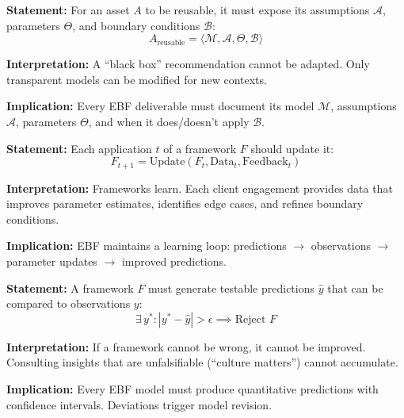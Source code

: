\begin{tcolorbox}[colback=gray!5!white, colframe=gray!75!black,
    title=Axiom FM-2: Transparency Principle]
\textbf{Statement:} For an asset $A$ to be reusable, it must expose its assumptions $\mathcal{A}$, parameters $\Theta$, and boundary conditions $\mathcal{B}$:
\begin{equation}
A_{\text{reusable}} = \langle \mathcal{M}, \mathcal{A}, \Theta, \mathcal{B} \rangle
\end{equation}

\textbf{Interpretation:} A ``black box'' recommendation cannot be adapted. Only transparent models can be modified for new contexts.

\textbf{Implication:} Every EBF deliverable must document its model $\mathcal{M}$, assumptions $\mathcal{A}$, parameters $\Theta$, and when it does/doesn't apply $\mathcal{B}$.
\end{tcolorbox}

\begin{tcolorbox}[colback=gray!5!white, colframe=gray!75!black,
    title=Axiom FM-3: Cumulative Growth Principle]
\textbf{Statement:} Each application $t$ of a framework $F$ should update it:
\begin{equation}
F_{t+1} = \text{Update}(F_t, \text{Data}_t, \text{Feedback}_t)
\end{equation}

\textbf{Interpretation:} Frameworks learn. Each client engagement provides data that improves parameter estimates, identifies edge cases, and refines boundary conditions.

\textbf{Implication:} EBF maintains a learning loop: predictions $\to$ observations $\to$ parameter updates $\to$ improved predictions.
\end{tcolorbox}

\begin{tcolorbox}[colback=gray!5!white, colframe=gray!75!black,
    title=Axiom FM-4: Falsifiability Requirement]
\textbf{Statement:} A framework $F$ must generate testable predictions $\hat{y}$ that can be compared to observations $y$:
\begin{equation}
\exists \, y^* : |y^* - \hat{y}| > \epsilon \implies \text{Reject } F
\end{equation}

\textbf{Interpretation:} If a framework cannot be wrong, it cannot be improved. Consulting insights that are unfalsifiable (``culture matters'') cannot accumulate.

\textbf{Implication:} Every EBF model must produce quantitative predictions with confidence intervals. Deviations trigger model revision.
\end{tcolorbox}


